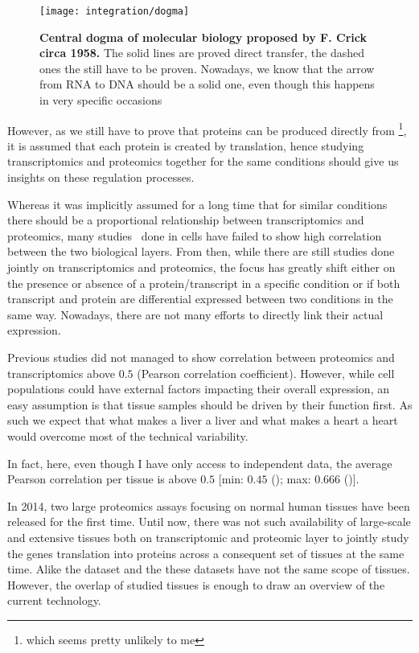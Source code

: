 \begin{figure}%
    \texttt{[image: integration/dogma]}\centering
    \caption[Central dogma of molecular biology proposed by F. Crick circa 1958]
    {\label{fig:dogma}\textbf{Central dogma of molecular biology proposed by
    F. Crick circa 1958.} The solid lines are proved direct transfer, the dashed
    ones the still have to be proven. Nowadays, we know that the arrow from RNA
    to DNA should be a solid one, even though this happens in very specific
    occasions}
\end{figure}

However, as we still have to prove that proteins can be produced directly
from \DNA\footnote{which seems pretty unlikely to me}, it is assumed that
each protein is created by translation, hence studying
transcriptomics and proteomics together for the same conditions should give us
insights on these regulation processes.

Whereas it was implicitly assumed for a long time that for similar conditions
there should be a proportional relationship between transcriptomics and
proteomics, many studies\
done in cells have failed to show high correlation between the two biological
layers. From then, while there are still studies done jointly on transcriptomics
and proteomics, the focus has greatly shift either on the presence or absence of
a protein/transcript in a specific condition or if both transcript and protein
are differential expressed between two conditions in the same way.
Nowadays, there are not many efforts to directly link their actual expression.

Previous studies did not managed to show correlation between proteomics and
transcriptomics above $0.5$ (Pearson correlation coefficient).
However, while cell populations could have external factors impacting their
overall expression, an easy assumption is that tissue samples should be driven
by their function first. As such we expect that what makes a liver a liver and
what makes a heart a heart would overcome most of the technical variability.

In fact, here, even though I have only access to independent data, the average
Pearson correlation per tissue is above $0.5$
[min: $0.45$ (); max: $0.666$ ()].

In 2014, two large proteomics assays focusing on normal human tissues have been
released for the first time.
Until now, there was not such availability of large-scale and extensive tissues
both on transcriptomic and proteomic layer to jointly study the genes
translation into proteins across a consequent set of tissues
at the same time. Alike the  dataset and the 
these datasets have not the same scope of tissues. However, the overlap of
studied tissues is enough to draw an overview of the current technology.

